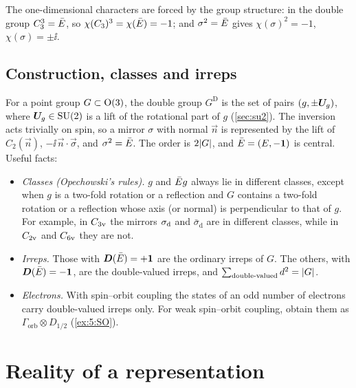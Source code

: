 The one-dimensional characters are forced by the group structure: in the double group
$C_3^3=\bar{E}$, so $\chi(C_3)^3=\chi(\bar{E})=-1$; and $\sigma^2=\bar{E}$ gives
$\chi(\sigma)^2=-1$, $\chi(\sigma)=\pm\ii$.

\subsection{Construction, classes and irreps\beyondmark}\label{sec:doublegroupsformal}
For a point group $G\subset\mathrm{O}(3)$, the double group $G^{\mathrm{D}}$ is the set of
pairs $(g,\pm\bm{U}_g)$, where $\bm{U}_g\in\mathrm{SU}(2)$ is a lift of the rotational part of $g$
(\cref{sec:su2}). The inversion acts trivially on spin, so a mirror $\sigma$ with normal
$\vec{n}$ is represented by the lift of $C_2(\vec{n})$, $-\ii\,\vec{n}\cdot\vec{\sigma}$, and
$\sigma^2=\bar{E}$. The order is $2\lvert G\rvert$, and $\bar{E}=(E,-\bm{1})$ is central. Useful facts:
\begin{itemize}
\item \emph{Classes (Opechowski's rules).} $g$ and $\bar{E} g$ always lie in different
      classes, except when $g$ is a two-fold rotation or a reflection and $G$ contains a
      two-fold rotation or a reflection whose axis (or normal) is perpendicular to that of
      $g$. For example, in $C_{3\mathrm{v}}$ the mirrors $\sigma_{\mathrm{d}}$ and $\bar{\sigma}_{\mathrm{d}}$ are in
      different classes, while in $C_{2\mathrm{v}}$ and $C_{6\mathrm{v}}$ they are not.
\item \emph{Irreps.} Those with $\bm{D}(\bar{E})=+\bm{1}$ are the ordinary irreps of $G$. The
      others, with $\bm{D}(\bar{E})=-\bm{1}$, are the double-valued irreps, and
      $\sum_{\text{double-valued}}d^2=\lvert G\rvert$.
\item \emph{Electrons.} With spin--orbit coupling the states of an odd number of electrons
      carry double-valued irreps only. For weak spin--orbit coupling, obtain them as
      $\Gamma_{\mathrm{orb}}\otimes D_{1/2}$ (\cref{ex:5:SO}).
\end{itemize}

\section{Reality of a representation}\label{sec:reality}

